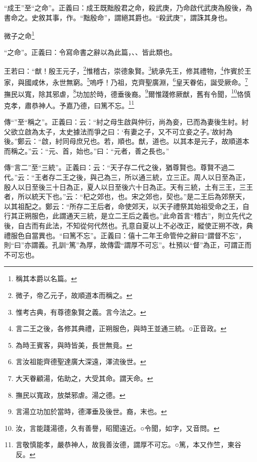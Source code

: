 {\noindent\shu{}\fzkt “成王”至“之命”。正義曰：成王既黜殷君之命，殺武庚，乃命啟代武庚為殷後，為書命之。史敘其事，作。“黜殷命”，謂絕其爵也。“殺武庚”，謂誅其身也。 \par}

微子之命\footnote{稱其本爵以名篇。}

{\noindent\shu{}\fzkt “之命”。正義曰：令寫命書之辭以為此篇，、、皆此類也。 \par}

王若曰：“猷！殷王元子，\footnote{微子，帝乙元子，故順道本而稱之。}惟稽古，崇德象賢。\footnote{惟考古典，有尊德象賢之義。言今法之。}統承先王，修其禮物，\footnote{言二王之後，各修其典禮，正朔服色，與時王並通三統。○正音政。}作賓於王家，與國咸休，永世無窮。\footnote{為時王賓客，與時皆美，長世無竟。}嗚呼！乃祖，克齊聖廣淵，\footnote{言汝祖能齊德聖達廣大深遠，澤流後世。}皇天眷佑，誕受厥命。\footnote{大天眷顧湯，佑助之，大受其命。謂天命。}撫民以寬，除其邪虐，\footnote{撫民以寬政，放桀邪虐。湯之德。}功加於時，德垂後裔。\footnote{言湯立功加於當時，德澤垂及後世。裔，末也。}爾惟踐修厥猷，舊有令聞，\footnote{汝，言能踐湯德，久有善譽，昭聞遠近。○令聞，如字，又音問。}恪慎克孝，肅恭神人。予嘉乃德，曰篤不忘。\footnote{言敬慎能孝，嚴恭神人，故我善汝德，謂厚不可忘。○篤，本又作竺，東谷反。}


{\noindent\zhuan{}\fzbyks 傳“”至“稱之”。正義曰：云：“紂之母生啟與仲衍，尚為妾，已而為妻後生紂。紂父欲立啟為太子，太史據法而爭之曰：‘有妻之子，又不可立妾之子。’故紂為後。”鄭云：“啟，紂同母庶兄也。若，順也。猷，道也。以其本是元子，故順道本而稱之。”云：“元、首，始也。”曰：“元者，善之長也。” \par}

{\noindent\zhuan{}\fzbyks 傳“言二”至“三統”。正義曰：云：“天子存二代之後，猶尊賢也。尊賢不過二代。”云：“王者存二王之後，與己為三，所以通三統，立三正。周人以日至為正，殷人以日至後三十日為正，夏人以日至後六十日為正。天有三統，土有三王，三王者，所以統天下也。”云：“杞之郊也，也。宋之郊也，契也。”是二王后為郊祭天，以其祖配之。鄭云：“所存二王后者，命使郊天，以天子禮祭其始祖受命之王，自行其正朔服色，此謂通天三統，是立二王后之義也。”此命首言“稽古”，則立先代之後，自古而有此法，不知從何代然也。孔意自夏以上不必改正，縱使正朔不改，典禮服色自當異也。“曰篤不忘”。正義曰：僖十二年王命管仲之辭曰“謂督不忘”，則“曰”亦謂義。孔訓“篤”為厚，故傳雲“謂厚不可忘”。杜預以“督”為正，可謂正而不可忘也。 \par}

